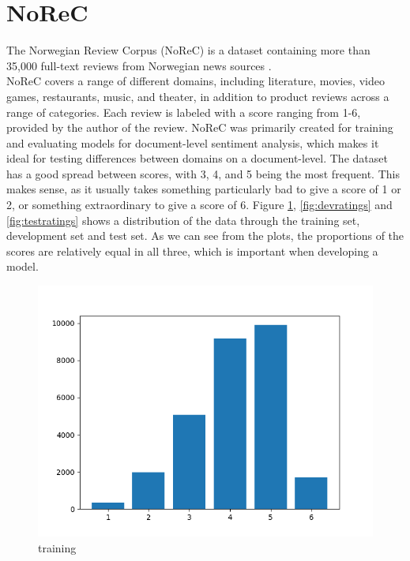 \documentclass{report}
\begin{document}
\section{NoReC}
The Norwegian Review Corpus (NoReC) is a dataset containing more than 35,000 full-text reviews from Norwegian news sources \cite{11509/124}.\\
NoReC covers a range of different domains, including literature, movies, video games, restaurants, music, and theater, in addition to product reviews across a range of categories. Each review is labeled with a score ranging from 1-6, provided by the author of the review. NoReC was primarily created for training and evaluating models for document-level sentiment analysis, which makes it ideal for testing differences between domains on a document-level. The dataset has a good spread between scores, with 3, 4, and 5 being the most frequent. This makes sense, as it usually takes something particularly bad to give a score of 1 or 2, or something extraordinary to give a score of 6. Figure \ref{fig:trainratings}, \ref{fig:devratings} and \ref{fig:testratings} shows a distribution of the data through the training set, development set and test set. As we can see from the plots, the proportions of the scores are relatively equal in all three, which is important when developing a model. 
\begin{figure}[h!]
	\centering
	\includegraphics[scale=0.5]{img/train_ratings}
	\caption{training}
	\label{fig:trainratings}
\end{figure}%
\end{document}
